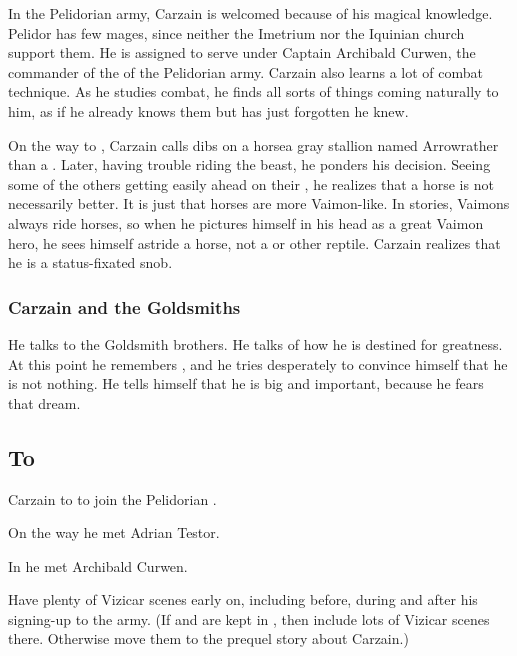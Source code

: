 In the Pelidorian army, Carzain is welcomed because of his magical knowledge. Pelidor has few mages, since neither the Imetrium nor the Iquinian church support them. He is assigned to serve under Captain Archibald Curwen, the commander of the \ishrah of the Pelidorian army.  
Carzain also learns a lot of combat technique. As he studies combat, he finds all sorts of things coming naturally to him, as if he already knows them but has just forgotten he knew. 

On the way to \Malcur, Carzain calls dibs on a horse\dash a gray stallion named Arrow\dash rather than a \relc. Later, having trouble riding the beast, he ponders his decision. Seeing some of the others getting easily ahead on their \relcs, he realizes that a horse is not necessarily better. It is just that horses are more Vaimon-like. In stories, Vaimons always ride horses, so when he pictures himself in his head as a great Vaimon hero, he sees himself astride a horse, not a \relc or other reptile. Carzain realizes that he is a status-fixated snob. 





\subsubsection{Carzain and the Goldsmiths}
He talks to the Goldsmith brothers. 
He talks of how he is destined for greatness. 
At this point he remembers , and he tries desperately to convince himself that he is not nothing. 
He tells himself that he is big and important, because he fears that dream. 









\subsection[To Malcur]{To \Malcur}
Carzain \travelled to \Malcur to join the Pelidorian \ishrah.

On the way he met Adrian Testor. 

In \Malcur he met Archibald Curwen. 

Have plenty of Vizicar scenes early on, including before, during and after his signing-up to the army. 
(If  and  are kept in \TwilightAngelRememberEmph, then include lots of Vizicar scenes there. Otherwise move them to the prequel story about Carzain.)

